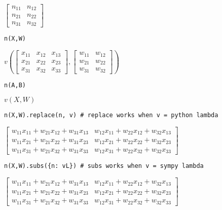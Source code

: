 \documentclass[
]{article}
\begin{document}
\(\displaystyle \left[\begin{matrix}n_{11} & n_{12}\\n_{21} & n_{22}\\n_{31} & n_{32}\end{matrix}\right]\)

\begin{verbatim}
n(X,W)
\end{verbatim}

\(\displaystyle v{\left(\left[\begin{matrix}x_{11} & x_{12} & x_{13}\\x_{21} & x_{22} & x_{23}\\x_{31} & x_{32} & x_{33}\end{matrix}\right],\left[\begin{matrix}w_{11} & w_{12}\\w_{21} & w_{22}\\w_{31} & w_{32}\end{matrix}\right] \right)}\)

\begin{verbatim}
n(A,B)
\end{verbatim}

\(\displaystyle v{\left(X,W \right)}\)

\begin{verbatim}
n(X,W).replace(n, v) # replace works when v = python lambda
\end{verbatim}

\(\displaystyle \left[\begin{matrix}w_{11} x_{11} + w_{21} x_{12} + w_{31} x_{13} & w_{12} x_{11} + w_{22} x_{12} + w_{32} x_{13}\\w_{11} x_{21} + w_{21} x_{22} + w_{31} x_{23} & w_{12} x_{21} + w_{22} x_{22} + w_{32} x_{23}\\w_{11} x_{31} + w_{21} x_{32} + w_{31} x_{33} & w_{12} x_{31} + w_{22} x_{32} + w_{32} x_{33}\end{matrix}\right]\)

\begin{verbatim}
n(X,W).subs({n: vL}) # subs works when v = sympy lambda
\end{verbatim}

\(\displaystyle \left[\begin{matrix}w_{11} x_{11} + w_{21} x_{12} + w_{31} x_{13} & w_{12} x_{11} + w_{22} x_{12} + w_{32} x_{13}\\w_{11} x_{21} + w_{21} x_{22} + w_{31} x_{23} & w_{12} x_{21} + w_{22} x_{22} + w_{32} x_{23}\\w_{11} x_{31} + w_{21} x_{32} + w_{31} x_{33} & w_{12} x_{31} + w_{22} x_{32} + w_{32} x_{33}\end{matrix}\right]\)
\end{document}
